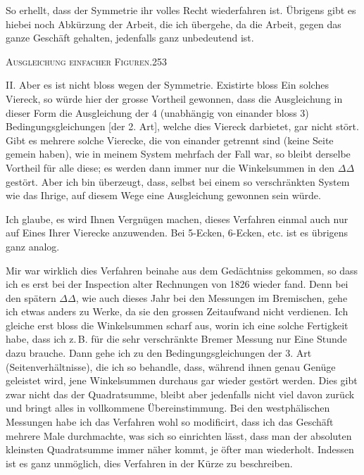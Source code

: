 So erhellt, dass der Symmetrie ihr volles Recht wiederfahren ist. Übrigens gibt es hiebei noch Abkürzung der Arbeit, die ich übergehe, da die Arbeit, gegen das ganze Geschäft gehalten, jedenfalls ganz unbedeutend ist.

\clearpage
\noindent\mbox{}\hfill\textsc{Ausgleichung einfacher Figuren.}\hfill253\par\medskip
II. Aber es ist nicht bloss wegen der Symmetrie. Existirte bloss Ein solches Viereck, so würde hier der grosse Vortheil gewonnen, dass die Ausgleichung in dieser Form die Ausgleichung der 4 (unabhängig von einander bloss 3) Bedingungsgleichungen [der 2. Art], welche dies Viereck darbietet, gar nicht stört. Gibt es mehrere solche Vierecke, die von einander getrennt sind (keine Seite gemein haben), wie in meinem System mehrfach der Fall war, so bleibt derselbe Vortheil für alle diese; es werden dann immer nur die Winkelsummen in den  $\Delta\Delta$ gestört. Aber ich bin überzeugt, dass, selbst bei einem so verschränkten System wie das Ihrige, auf diesem Wege eine  Ausgleichung gewonnen sein würde.

Ich glaube, es wird Ihnen Vergnügen machen, dieses Verfahren einmal auch nur auf Eines Ihrer Vierecke anzuwenden. Bei 5-Ecken, 6-Ecken, etc. ist es übrigens ganz analog.

Mir war wirklich dies Verfahren beinahe aus dem Gedächtniss gekommen, so dass ich es erst bei der Inspection alter Rechnungen von 1826 wieder fand. Denn bei den spätern $\Delta\Delta$, wie auch dieses Jahr bei den Messungen im Bremischen, gehe ich etwas anders zu Werke, da sie den grossen Zeitaufwand nicht verdienen. Ich gleiche erst bloss die Winkelsummen scharf aus, worin ich eine solche Fertigkeit habe, dass ich z.\,B. für die sehr verschränkte Bremer Messung nur Eine Stunde dazu brauche. Dann gehe ich zu den Bedingungsgleichungen der 3. Art (Seitenverhältnisse), die ich so behandle, dass, während ihnen genau Genüge geleistet wird, jene Winkelsummen durchaus gar  wieder gestört werden. Dies gibt zwar nicht das  der Quadratsumme, bleibt aber jedenfalls nicht viel davon zurück und bringt alles in vollkommene Übereinstimmung. Bei den westphälischen Messungen habe ich das Verfahren wohl so modificirt, dass ich das Geschäft mehrere Male durchmachte, was sich so einrichten lässt, dass man der absoluten kleinsten Quadratsumme immer näher kommt, je öfter man wiederholt. Indessen ist es ganz unmöglich, dies Verfahren in der Kürze zu beschreiben.

